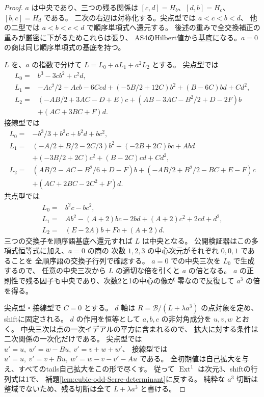 \begin{proof}
$a$ は中央であり、三つの残る関係は
$[c,d]=H_b$、$[d,b]=H_c$、$[b,c]=H_d$ である。
二次の右辺は対称化する。尖点型では $a<c<b<d$、
他の二型では $a<b<c<d$ で順序単項式へ還元する。
後述の重みで全交換補正の重みが厳密に下がるためこれらは張り、
AS4のHilbert値から基底になる。$a=0$ の商は同じ順序単項式の基底を持つ。

$L$ を、$a$ の指数で分けて $L=L_0+aL_1+a^2L_2$ とする。
尖点型では
\begin{align*}
 L_0={}&b^3-3cb^2+c^2d,\\
 L_1={}&-Ac^2/2+Acb-6Ccd+(-5B/2+12C)b^2+(B-6C)bd+Cd^2,\\
 L_2={}&(-AB/2+3AC-D+E)c+(AB-3AC-B^2/2+D-2F)b\\
       &+(AC+3BC+F)d.
\end{align*}
接線型では
\begin{align*}
 L_0={}&-b^3/3+b^2c+b^2d+bc^2,\\
 L_1={}&(-A/2+B/2-2C/3)b^2+(-2B+2C)bc+Abd\\
       &+(-3B/2+2C)c^2+(B-2C)cd+Cd^2,\\
 L_2={}&(AB/2-AC-B^2/6+D-F)b+(-AB/2+B^2/2-BC+E-F)c\\
       &+(AC+2BC-2C^2+F)d.
\end{align*}
共点型では
\begin{align*}
 L_0={}&b^2c-bc^2,\\
 L_1={}&Ab^2-(A+2)bc-2bd+(A+2)c^2+2cd+d^2,\\
 L_2={}&(E-2A)b+Fc+(A+2)d.
\end{align*}
三つの交換子を順序語基底へ還元すれば $L$ は中央となる。
公開検証器はこの多項式恒等式に加え、$a=0$ の商の
次数 $1,2,3$ の中心次元がそれぞれ $0,0,1$ であることを
全順序語の交換子行列で確認する。
$a=0$ での中央三次を $L_0$ で生成するので、
任意の中央三次から $L$ の適切な倍を引くと $a$ の倍となる。
$a$ の正則性で残る因子も中央であり、次数2と1の中心の像が
零なので反復して $a^3$ の倍を得る。

尖点型・接線型で $C=0$ とする。
$d$ 軸は $R=\mathcal B/(L+\lambda a^3)$ の点対象を定め、shiftに固定される。
$d$ の作用を恒等として $a,b,c$ の非対角成分を $u,v,w$ とおく。
中央三次は点の一次イデアルの平方に含まれるので、
拡大に対する条件は二次関係の一次化だけである。
尖点型では $u'=u,\ w'=w-Bu,\ v'=v+w+w'$、
接線型では $u'=u,\ v'=v+Bu,\ w'=w-v-v'-Au$ である。
全初期値は自己拡大を与え、すべてのtails自己拡大をこの形で尽くす。
従って $\operatorname{Ext}^1$ は次元3、shiftの行列式は1で、
補題\ref{lem:cubic-odd-Serre-determinant}に反する。
純粋な $a^3$ 切断は整域でないため、残る切断は全て $L+\lambda a^3$ と書ける。


\end{proof}
